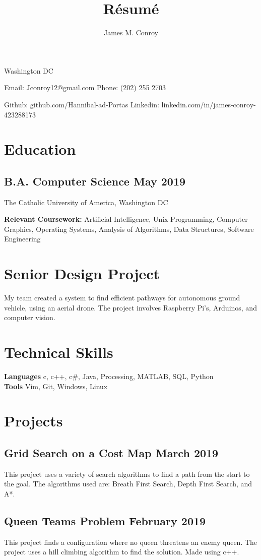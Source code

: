 \documentclass{article}
\author{James M. Conroy}
\title{R\'esum\'e}
\makeatletter
\renewcommand{\maketitle} {
	\begin{center}
	{\huge\bfseries
	\theauthor}

	Washington DC
	\end{center}


	Email: Jconroy12@gmail.com
	\hfill Phone: (202) 255 2703

	Github: github.com/Hannibal-ad-Portas
	\hfill Linkedin: linkedin.com/in/james-conroy-423288173
}
\makeatother
\begin{document}
\maketitle
\section{Education}
\subsection{B.A. Computer Science \hfill  May 2019}
The Catholic University of America, Washington DC

\textbf {Relevant Coursework:}
Artificial Intelligence,
Unix Programming,
Computer Graphics,
Operating Systems,
Analysis of Algorithms,
Data Structures,
Software Engineering
\section{Senior Design Project}
My team created a system to find efficient pathways for autonomous ground vehicle, using an aerial drone.
The project involves Raspberry Pi's, Arduinos, and computer vision.
\section{Technical Skills}

\textbf{Languages}
c,
c++,
c\#,
Java,
Processing,
MATLAB,
SQL,
Python \\
\textbf{Tools}
Vim,
Git,
Windows,
Linux

\section{Projects}

\subsection{Grid Search on a Cost Map \hfill March 2019}
This project uses a variety of search algorithms to find a path from the start to the goal.
The algorithms used are:
Breath First Search,
Depth First Search,
and
A*.
\subsection{Queen Teams Problem \hfill February 2019}
This project finds a configuration where no queen threatens an enemy queen.
The project uses a hill climbing algorithm to find the solution.
Made using c++.
\end{document}
